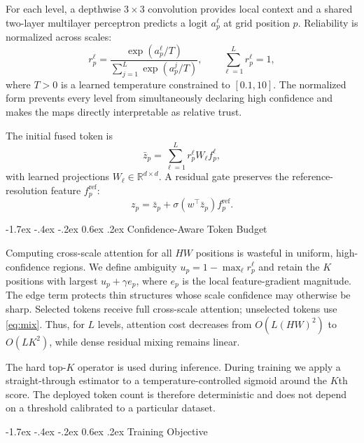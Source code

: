 \documentclass[10pt,twocolumn,letterpaper]{article}
\makeatletter
\newcommand{\R}{\mathbb{R}}
\renewcommand\subsection{\@startsection{subsection}{2}{\z@}%
  {-1.7ex \@plus -.4ex \@minus -.2ex}%
  {0.6ex \@plus .2ex}%
  {\normalfont\normalsize\bfseries}}
\makeatother
\begin{document}
For each level, a depthwise $3\times3$ convolution provides local context and a
shared two-layer multilayer perceptron predicts a logit $a^{\ell}_{p}$ at grid
position $p$. Reliability is normalized across scales:
\begin{equation}
  r^{\ell}_{p} =
  \frac{\exp(a^{\ell}_{p}/T)}
       {\sum_{j=1}^{L}\exp(a^{j}_{p}/T)},
  \qquad \sum_{\ell=1}^{L} r^{\ell}_{p}=1,
  \label{eq:reliability}
\end{equation}
where $T>0$ is a learned temperature constrained to $[0.1,10]$. The normalized
form prevents every level from simultaneously declaring high confidence and
makes the maps directly interpretable as relative trust.

The initial fused token is
\begin{equation}
  \bar{z}_{p}=\sum_{\ell=1}^{L}r^{\ell}_{p}W_{\ell}f^{\ell}_{p},
  \label{eq:mix}
\end{equation}
with learned projections $W_{\ell}\in\R^{d\times d}$. A residual gate preserves
the reference-resolution feature $f^{\mathrm{ref}}_{p}$:
\begin{equation}
  z_{p}=\bar{z}_{p}+\sigma\!\left(w^{\top}\bar{z}_{p}\right)
  f^{\mathrm{ref}}_{p}.
  \label{eq:residual}
\end{equation}

\subsection{Confidence-Aware Token Budget}

Computing cross-scale attention for all $HW$ positions is wasteful in uniform,
high-confidence regions. We define ambiguity
$u_p=1-\max_{\ell}r^{\ell}_{p}$ and retain the $K$ positions with largest
$u_p+\gamma e_p$, where $e_p$ is the local feature-gradient magnitude. The
edge term protects thin structures whose scale confidence may otherwise be
sharp. Selected tokens receive full cross-scale attention; unselected tokens
use \cref{eq:mix}. Thus, for $L$ levels, attention cost decreases from
$O(L(HW)^2)$ to $O(LK^2)$, while dense residual mixing remains linear.

The hard top-$K$ operator is used during inference. During training we apply a
straight-through estimator to a temperature-controlled sigmoid around the
$K$th score. The deployed token count is therefore deterministic and does not
depend on a threshold calibrated to a particular dataset.

\subsection{Training Objective}
\end{document}
